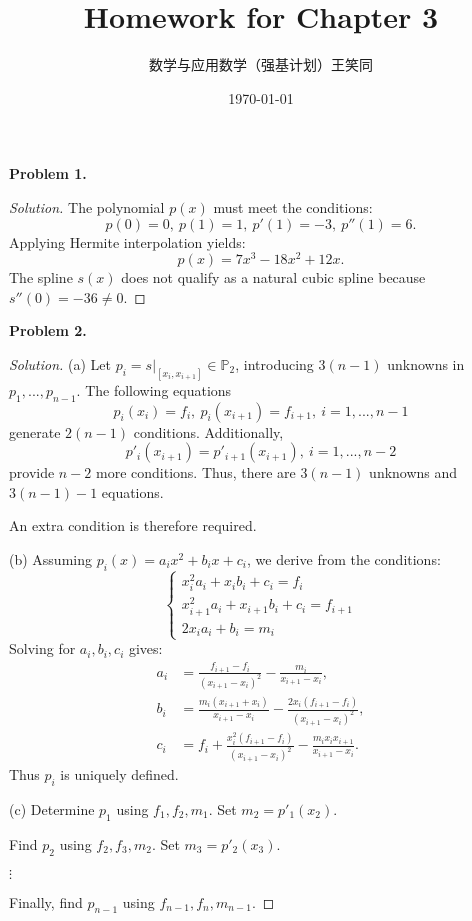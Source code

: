\documentclass[a4paper]{ctexart}
\title{Homework for Chapter 3}
\author{数学与应用数学（强基计划）\qquad 王笑同\qquad 3210105450}
\date{\today}
\begin{document}
\maketitle
\textbf{Problem 1.}

\begin{proof}[Solution]
	The polynomial $p(x)$ must meet the conditions:
	$$
		p(0)=0, \ p(1)=1, \ p'(1)=-3, \ p''(1)=6.
	$$
	Applying Hermite interpolation yields:
	$$
		p(x)=7x^3-18x^2+12x.
	$$
	The spline $s(x)$ does not qualify as a natural cubic spline because $s''(0)=-36\neq 0$.
\end{proof}

\textbf{Problem 2.}

\begin{proof}[Solution]
	(a) Let $p_i=s|_{[x_i,x_{i+1}]}\in\mathbb{P}_2$, introducing $3(n-1)$ unknowns in $p_1,...,p_{n-1}$. The following equations
	$$
		p_i(x_i)=f_i, \ p_i(x_{i+1})=f_{i+1}, \ i=1,...,n-1
	$$
	generate $2(n-1)$ conditions. Additionally,
	$$
		p'_i(x_{i+1})=p'_{i+1}(x_{i+1}), \ i=1,...,n-2
	$$
	provide $n-2$ more conditions. Thus, there are $3(n-1)$ unknowns and $3(n-1)-1$ equations.

	An extra condition is therefore required.

	(b) Assuming $p_i(x)=a_ix^2+b_ix+c_i$, we derive from the conditions:
	$$
		\begin{cases}
			x_i^2a_i+x_ib_i+c_i=f_i             \\
			x_{i+1}^2a_i+x_{i+1}b_i+c_i=f_{i+1} \\
			2x_ia_i+b_i=m_i
		\end{cases}
	$$
	Solving for $a_i,b_i,c_i$ gives:
	\begin{align*}
		a_i & =\frac{f_{i+1}-f_i}{(x_{i+1}-x_i)^2}-\frac{m_i}{x_{i+1}-x_i},                        \\
		b_i & =\frac{m_i(x_{i+1}+x_i)}{x_{i+1}-x_i}-\frac{2x_i(f_{i+1}-f_i)}{(x_{i+1}-x_i)^2},     \\
		c_i & =f_i+\frac{x_i^2(f_{i+1}-f_i)}{(x_{i+1}-x_i)^2} - \frac{m_ix_ix_{i+1}}{x_{i+1}-x_i}.
	\end{align*}
	Thus $p_i$ is uniquely defined.

	(c) Determine $p_1$ using $f_1,f_2,m_1$. Set $m_2=p'_1(x_2)$.

	Find $p_2$ using $f_2,f_3,m_2$. Set $m_3=p'_2(x_3)$.

	$\vdots$

	Finally, find $p_{n-1}$ using $f_{n-1},f_n,m_{n-1}$.

\end{proof}
\end{document}
